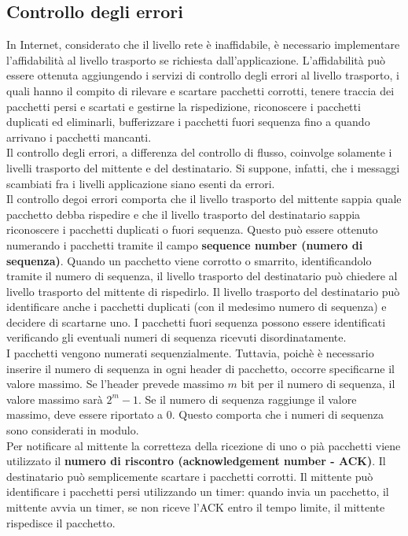 \documentclass[12pt]{report}
\begin{document}
	\subsection{Controllo degli errori}
	In Internet, considerato che il livello rete è inaffidabile, è necessario implementare l'affidabilità al livello trasporto se richiesta dall'applicazione. L'affidabilità può essere ottenuta aggiungendo i servizi di controllo degli errori al livello trasporto, i quali hanno il compito di rilevare e scartare pacchetti corrotti, tenere traccia dei pacchetti persi e scartati e gestirne la rispedizione, riconoscere i pacchetti duplicati ed eliminarli, bufferizzare i pacchetti fuori sequenza fino a quando arrivano i pacchetti mancanti.\\
	Il controllo degli errori, a differenza del controllo di flusso, coinvolge solamente i livelli trasporto del mittente e del destinatario. Si suppone, infatti, che i messaggi scambiati fra i livelli applicazione siano esenti da errori. \\
	Il controllo degoi errori comporta che il livello trasporto del mittente sappia quale pacchetto debba rispedire e che il livello trasporto del destinatario sappia riconoscere i pacchetti duplicati o fuori sequenza. Questo può essere ottenuto numerando i pacchetti tramite il campo \textbf{sequence number (numero di sequenza)}. Quando un pacchetto viene corrotto o smarrito, identificandolo tramite il numero di sequenza, il livello trasporto del destinatario può chiedere al livello trasporto del mittente di rispedirlo. Il livello trasporto del destinatario può identificare anche i pacchetti duplicati (con il medesimo numero di sequenza) e decidere di scartarne uno. I pacchetti fuori sequenza possono essere identificati verificando gli eventuali numeri di sequenza ricevuti disordinatamente.\\
	I pacchetti vengono numerati sequenzialmente. Tuttavia, poichè è necessario inserire il numero di sequenza in ogni header di pacchetto, occorre specificarne il valore massimo. Se l'header prevede massimo $m$ bit per il numero di sequenza, il valore massimo sarà $2^m - 1$. Se il numero di sequenza raggiunge il valore massimo, deve essere riportato a 0. Questo comporta che i numeri di sequenza sono considerati in modulo.\\
	Per notificare al mittente la corretteza della ricezione di uno o pià pacchetti viene utilizzato il \textbf{numero di riscontro (acknowledgement number - ACK)}. Il destinatario può semplicemente scartare i pacchetti corrotti. Il mittente può identificare i pacchetti persi utilizzando un timer: quando invia un pacchetto, il mittente avvia un timer, se non riceve l'ACK entro il tempo limite, il mittente rispedisce il pacchetto.
\end{document}
